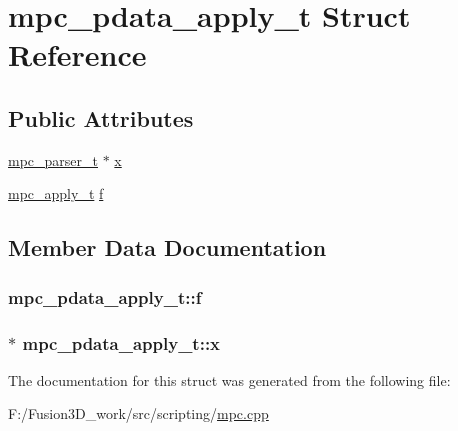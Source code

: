 \hypertarget{structmpc__pdata__apply__t}{}\section{mpc\+\_\+pdata\+\_\+apply\+\_\+t Struct Reference}
\label{structmpc__pdata__apply__t}
\subsection*{Public Attributes}
\begin{DoxyCompactItemize}
\item 
\hyperlink{structmpc__parser__t}{mpc\+\_\+parser\+\_\+t} $\ast$ \hyperlink{structmpc__pdata__apply__t_ab704c8a9748135bf05bbd4fe98a5378b}{x}
\item 
\hyperlink{mpc_8h_a0d857b3b4ecdca502b674d69d9e7097d}{mpc\+\_\+apply\+\_\+t} \hyperlink{structmpc__pdata__apply__t_a82b954a121c8e8a919bf8695e84d712f}{f}
\end{DoxyCompactItemize}


\subsection{Member Data Documentation}
\hypertarget{structmpc__pdata__apply__t_a82b954a121c8e8a919bf8695e84d712f}{}
\subsubsection[{f}]{ mpc\+\_\+pdata\+\_\+apply\+\_\+t\+::f}\label{structmpc__pdata__apply__t_a82b954a121c8e8a919bf8695e84d712f}
\hypertarget{structmpc__pdata__apply__t_ab704c8a9748135bf05bbd4fe98a5378b}{}
\subsubsection[{x}]{$\ast$ mpc\+\_\+pdata\+\_\+apply\+\_\+t\+::x}\label{structmpc__pdata__apply__t_ab704c8a9748135bf05bbd4fe98a5378b}


The documentation for this struct was generated from the following file\+:\begin{DoxyCompactItemize}
\item 
F\+:/\+Fusion3\+D\+\_\+work/src/scripting/\hyperlink{mpc_8cpp}{mpc.\+cpp}\end{DoxyCompactItemize}

